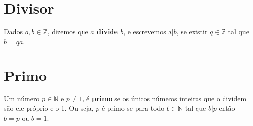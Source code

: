 \section{Divisor}\label{sec:divisor}
Dados $a, b \in \mathbb{Z}$, dizemos que \textbf{$a$ divide $b$}, e escrevemos $a|b$, se existir $q \in \mathbb{Z}$ tal que $b = qa$.

\section{Primo}\label{sec:primo}
Um número $p \in \mathbb{N}$ e $p \neq 1$, é \textbf{primo} se os únicos números inteiros que o dividem são ele próprio e o 1. Ou seja, $p$ é primo se para todo $b \in \mathbb{N}$ tal que $b|p$ então $b=p$ ou $b=1$.

